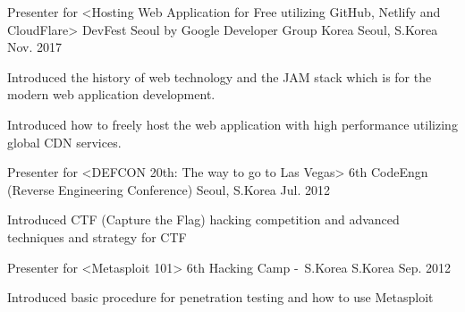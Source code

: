 

\begin{cventries}

  \cventry
    {Presenter for <Hosting Web Application for Free utilizing GitHub, Netlify and CloudFlare>} %
    {DevFest Seoul by Google Developer Group Korea} %
    {Seoul, S.Korea} %
    {Nov. 2017} %
    {
      \begin{cvitems} %
        \item {Introduced the history of web technology and the JAM stack which is for the modern web application development.}
        \item {Introduced how to freely host the web application with high performance utilizing global CDN services.}
      \end{cvitems}
    }

  \cventry
    {Presenter for <DEFCON 20th: The way to go to Las Vegas>} %
    {6th CodeEngn (Reverse Engineering Conference)} %
    {Seoul, S.Korea} %
    {Jul. 2012} %
    {
      \begin{cvitems} %
        \item {Introduced CTF (Capture the Flag) hacking competition and advanced techniques and strategy for CTF}
      \end{cvitems}
    }

  \cventry
    {Presenter for <Metasploit 101>} %
    {6th Hacking Camp -\ S.Korea} %
    {S.Korea} %
    {Sep. 2012} %
    {
      \begin{cvitems} %
        \item {Introduced basic procedure for penetration testing and how to use Metasploit}
      \end{cvitems}
    }

\end{cventries}
